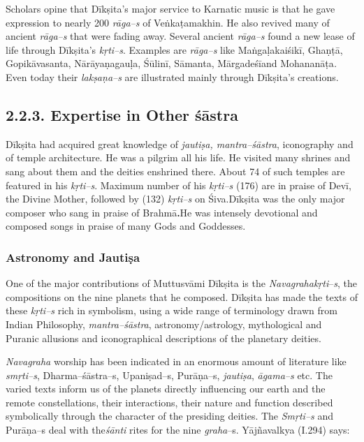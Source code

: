 Scholars opine that Dīkṣita’s major service to Karnatic music is that he gave expression to nearly 200 \textit{rāga–s} of Veṅkaṭamakhin. He also revived many of ancient \textit{rāga–s} that were fading away. Several ancient \textit{rāga–s} found a new lease of life through Dīkṣita’s \textit{kṛti–s}. Examples are \textit{rāga–s} like Maṅgaḷakaiśikī, Ghaṇṭā, Gopikāvasanta, Nārāyaṇagauḷa, Śūlinī, Sāmanta, Mārgadeśīand Mohananāṭa\textit{. }Even today their \textit{lakṣaṇa–s} are illustrated mainly through Dīkṣita’s creations.


\subsection*{2.2.3. Expertise in Other śāstra}

Dīkṣita had acquired great knowledge of \textit{jautiṣa, mantra–śāstra}, iconography and of temple architecture. He was a pilgrim all his life. He visited many shrines and sang about them and the deities enshrined there. About 74 of such temples are featured in his \textit{kṛti–s}. Maximum number of his \textit{kṛti–s} (176) are in praise of Devī, the Divine Mother, followed by (132) \textit{kṛti–s} on Śiva.Dīkṣita was the only major composer who sang in praise of Brahmā\textbf{.}He was intensely devotional and composed songs in praise of many Gods and Goddesses.

\subsubsection*{Astronomy and Jautiṣa}

One of the major contributions of Muttusvāmi Dīkṣita is the \textit{Navagrahakṛti}–\textit{s}, the compositions on the nine planets that he composed. Dīkṣita has made the texts of these \textit{kṛti–s} rich in symbolism, using a wide range of terminology drawn from Indian Philosophy, \textit{mantra–śāstra}, astronomy/astrology, mythological and Puranic allusions and iconographical descriptions of the planetary deities.

\textit{Navagraha} worship has been indicated in an enormous amount of literature like \textit{smṛti–s}, Dharma–śāstra–s, Upaniṣad–s, Purāṇa–s, \textit{jautiṣa}, \textit{āgama–s} etc. The varied texts inform us of the planets directly influencing our earth and the remote constellations, their interactions, their nature and function described symbolically through the character of the presiding deities. The \textit{Smṛti–s} and Purāṇa–s deal with the\textit{śānti} rites for the nine \textit{graha}–s. Yājñavalkya (I.294) says:

